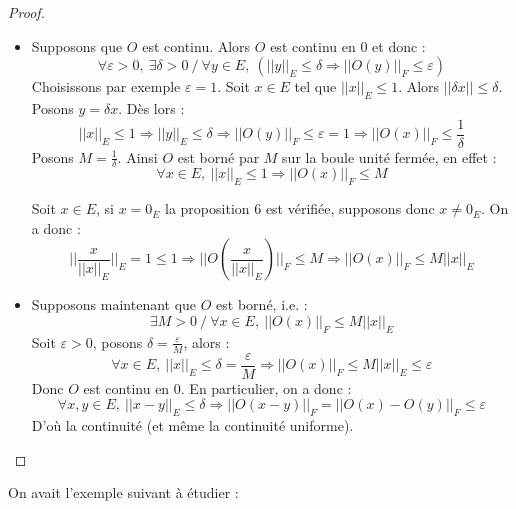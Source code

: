 \documentclass[a4paper,11pt]{article}
\theoremstyle{plain}
\theoremstyle{definition}
\begin{document}
\begin{proof}
	\begin{itemize}
		\item Supposons que $O$ est continu. Alors $O$ est continu en $0$ et donc :
		\[
			\forall \varepsilon > 0, \ \exists \delta > 0 \ / \ \forall y \in E, \ \left(||y||_{E} \leq \delta \Rightarrow ||O(y)||_{F} \leq \varepsilon \right)
		\]
		Choisissons par exemple $\varepsilon = 1$.
		Soit $x \in E$ tel que $||x||_{E} \leq 1$.
		Alors $||\delta x|| \leq \delta$.
		Posons $y = \delta x$.
		Dès lors : 
		\[
			||x||_{E} \leq 1 \Rightarrow ||y||_{E} \leq \delta \Rightarrow ||O(y)||_{F} \leq \varepsilon = 1 \Rightarrow ||O(x)||_{F} \leq \frac{1}{\delta}
		\]
		Posons $M = \frac{1}{\delta}$.
		Ainsi $O$ est borné par $M$ sur la boule unité fermée, en effet :
		\[
			\forall x \in E, \ ||x||_{E} \leq 1 \Rightarrow ||O(x)||_{F} \leq M
		\]	

		Soit $x \in E$, si $x = 0_{E}$ la proposition 6 est vérifiée, supposons donc $x \neq 0_{E}$.
		On a donc :
		\[
			||\frac{x}{||x||_{E}}||_{E} = 1 \leq 1 \Rightarrow ||O\left(\frac{x}{||x||_{E}}\right)||_{F} \leq M \Rightarrow ||O(x)||_{F} \leq M||x||_{E}
		\]
		\item Supposons maintenant que $O$ est borné, i.e. :
		\[
			\exists M > 0 \ / \ \forall x \in E, \ ||O(x)||_{F} \leq M||x||_{E}
		\]
		Soit $\varepsilon > 0$, posons $\delta = \frac{\varepsilon}{M}$, alors :
		\[
			\forall x \in E, \ ||x||_{E} \leq \delta = \frac{\varepsilon}{M} \Rightarrow ||O(x)||_{F} \leq M||x||_{E} \leq \varepsilon
		\]
		Donc $O$ est continu en $0$.
		En particulier, on a donc :
		\[
			\forall x,y \in E, \ ||x - y||_{E} \leq \delta \Rightarrow ||O(x -y)||_{F} = ||O(x) - O(y)||_{F} \leq \varepsilon
		\]
		D'où la continuité (et même la continuité uniforme).
	\end{itemize}
\end{proof}

On avait l'exemple suivant à étudier :
\end{document}
